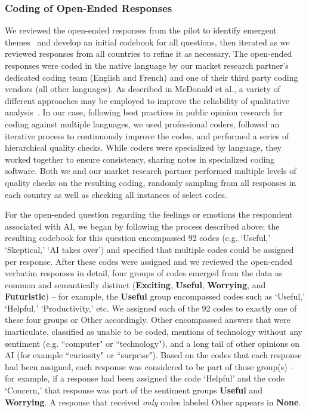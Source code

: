 \documentclass[sigconf]{acmart}
\def\Exciting/{{\fontfamily{lmss}\selectfont\textbf{Exciting}}}  \def\Useful/{{\fontfamily{lmss}\selectfont\textbf{Useful}}}
\def\Worrying/{{\fontfamily{lmss}\selectfont\textbf{Worrying}}}
\def\Futuristic/{{\fontfamily{lmss}\selectfont\textbf{Futuristic}}}
\def\None/{{\fontfamily{lmss}\selectfont\textbf{None}}}
\begin{document}
\subsubsection{Coding of Open-Ended Responses}\label{Coding_Section}
We reviewed the open-ended responses from the pilot to identify emergent themes~\cite{beyer1997contextual} and develop an initial codebook for all questions, then iterated as we reviewed responses from all countries to refine it as necessary.
The open-ended responses were coded in the native language by our market research partner's dedicated coding team (English and French) and one of their third party coding vendors (all other languages).
As described in McDonald et al., a variety of different approaches may be employed to improve the reliability of qualitative analysis~\cite{mcdonald2019}.
In our case, following best practices in public opinion research for coding against multiple languages, we used professional coders, followed an iterative process to continuously improve the codes, and performed a series of hierarchical quality checks.
While coders were specialized by language, they worked together to ensure consistency, sharing notes in specialized coding software. Both we and our market research partner performed multiple levels of quality checks on the resulting coding, randomly sampling from all responses in each country as well as checking all instances of select codes. 

For the open-ended question regarding the feelings or emotions the respondent associated with AI, we began by following the process described above; the resulting codebook for this question encompassed 92 codes (e.g. `Useful,' `Skeptical,' `AI takes over') and specified that multiple codes could be assigned per response. After these codes were assigned and we reviewed the open-ended verbatim responses in detail, four groups of codes emerged from the data as common and semantically distinct (\Exciting/, \Useful/, \Worrying/, and \Futuristic/) -- for example, the \Useful/ group encompassed codes such as `Useful,' `Helpful,' `Productivity,' etc. 
We assigned each of the 92 codes to exactly one of these four groups or Other accordingly. Other encompassed answers that were inarticulate, classified as unable to be coded, mentions of technology without any sentiment (e.g. ``computer" or ``technology"), and a long tail of other opinions on AI (for example ``curiosity" or ``surprise"). Based on the codes that each response had been assigned, each response was considered to be part of those group(s) -- for example, if a response had been assigned the code `Helpful' and the code `Concern,' that response was part of the sentiment groups \Useful/ and \Worrying/. A response that received \textit{only} codes labeled Other appears in \None/.
\end{document}
